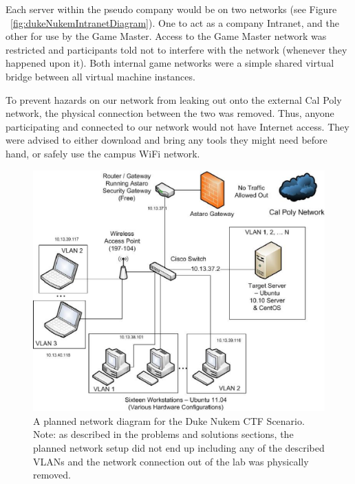 \documentclass[10pt]{article}
\begin{document}
Each server within the pseudo company would be on two networks (see Figure
~\ref{fig:dukeNukemIntranetDiagram}). One to act as a company Intranet, and the
other for use by the Game Master. Access to the Game Master network was
restricted and participants told not to interfere with the network (whenever
they happened upon it). Both internal game networks were a simple shared virtual
bridge between all virtual machine instances.

To prevent hazards on our network from leaking out onto the external Cal Poly
network, the physical connection between the two was removed. Thus, anyone
participating and connected to our network would not have Internet access. They
were advised to either download and bring any tools they might need before hand,
or safely use the campus WiFi network.

\begin{figure}[here]
\includegraphics[scale=.50]{resources/dukenukem_network_diagram.eps}
\caption{A planned network diagram for the Duke Nukem CTF Scenario. Note: as
described in the problems and solutions sections, the planned network setup
did not end up including any of the described VLANs and the network connection
out of the lab was physically removed.}
\label{fig:dukeNetworkDiagram}
\end{figure}
\end{document}
